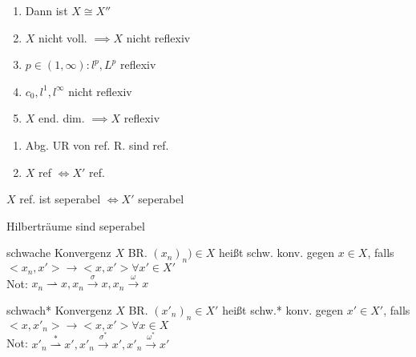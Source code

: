 \begin{bemerkung}
    \begin{enumerate}[label = (\roman*)]
        \item Dann ist \(X\cong X''\)
        \item \(X\) nicht voll. \(\implies X\) nicht reflexiv
        \item \(p\in (1,\infty): l^p, L^p\) reflexiv
        \item \(c_0, l^1, l^\infty\) nicht reflexiv
        \item \(X\) end. dim. \(\implies X\) reflexiv
    \end{enumerate}
\end{bemerkung}

\begin{lemma}
    \begin{enumerate}[label = (\roman*)]
        \item Abg. UR von ref. R. sind ref.
        \item \(X\) ref \(\Leftrightarrow X'\) ref.
    \end{enumerate}
\end{lemma}

\begin{korrolar}
    \(X\) ref. ist seperabel \(\Leftrightarrow X'\) seperabel
\end{korrolar}

\begin{bemerkung}
    Hilberträume sind seperabel
\end{bemerkung}

\begin{definition}{schwache Konvergenz}
    \(X\) BR. \((x_n)_n) \in X\) heißt schw. konv. gegen \(x\in X\), falls
    \(<x_n,x'> \to <x,x'> \forall x'\in X'\)\\
    Not: \(x_n \rightharpoonup x, x_n \stackrel{\sigma}{\to} x,
    x_n \stackrel{\omega}{\to} x\)
\end{definition}

\begin{definition}{schwach* Konvergenz}
    \(X\) BR. \((x'_n)_n \in X'\) heißt schw.* konv. gegen \(x'\in X'\), falls
    \(<x,x'_n> \to <x,x'> \forall x\in X\)\\
    Not: \(x'_n \stackrel{*}{\rightharpoonup} x',
    x'_n \stackrel{\sigma^*}{\to} x', x'_n \stackrel{\omega^*}{\to}x'\)
\end{definition}

